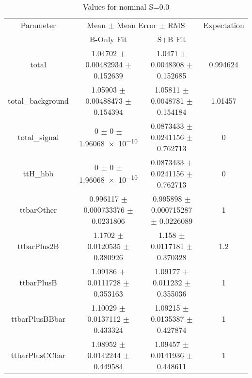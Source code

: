 \begin{table}
\centering
\caption{Values for nominal S=0.0}
\begin{tabular}{cccc}
\toprule
Parameter & \multicolumn{2}{c}{Mean $\pm$ Mean Error $\pm$ RMS} & Expectation\\
 & B-Only Fit & S+B Fit & \\
\midrule
total & \num{1.04702} $\pm$ \num{0.00482934} $\pm$ \num{0.152639} & \num{1.0471} $\pm$ \num{0.0048308} $\pm$ \num{0.152685} & \num{0.994624}\\
total\_background & \num{1.05903} $\pm$ \num{0.00488473} $\pm$ \num{0.154394} & \num{1.05811} $\pm$ \num{0.0048781} $\pm$ \num{0.154184} & \num{1.01457}\\
total\_signal & \num{0} $\pm$ \num{0} $\pm$ \num{1.96068e-10} & \num{0.0873433} $\pm$ \num{0.0241156} $\pm$ \num{0.762713} & \num{0}\\
ttH\_hbb & \num{0} $\pm$ \num{0} $\pm$ \num{1.96068e-10} & \num{0.0873433} $\pm$ \num{0.0241156} $\pm$ \num{0.762713} & \num{0}\\
ttbarOther & \num{0.996117} $\pm$ \num{0.000733376} $\pm$ \num{0.0231806} & \num{0.995898} $\pm$ \num{0.000715287} $\pm$ \num{0.0226089} & \num{1}\\
ttbarPlus2B & \num{1.1702} $\pm$ \num{0.0120535} $\pm$ \num{0.380926} & \num{1.158} $\pm$ \num{0.0117181} $\pm$ \num{0.370328} & \num{1.2}\\
ttbarPlusB & \num{1.09186} $\pm$ \num{0.0111728} $\pm$ \num{0.353163} & \num{1.09177} $\pm$ \num{0.011232} $\pm$ \num{0.355036} & \num{1}\\
ttbarPlusBBbar & \num{1.10029} $\pm$ \num{0.0137112} $\pm$ \num{0.433324} & \num{1.09215} $\pm$ \num{0.0135387} $\pm$ \num{0.427874} & \num{1}\\
ttbarPlusCCbar & \num{1.08952} $\pm$ \num{0.0142244} $\pm$ \num{0.449584} & \num{1.09457} $\pm$ \num{0.0141936} $\pm$ \num{0.448611} & \num{1}\\
\bottomrule
\end{tabular}
\end{table}